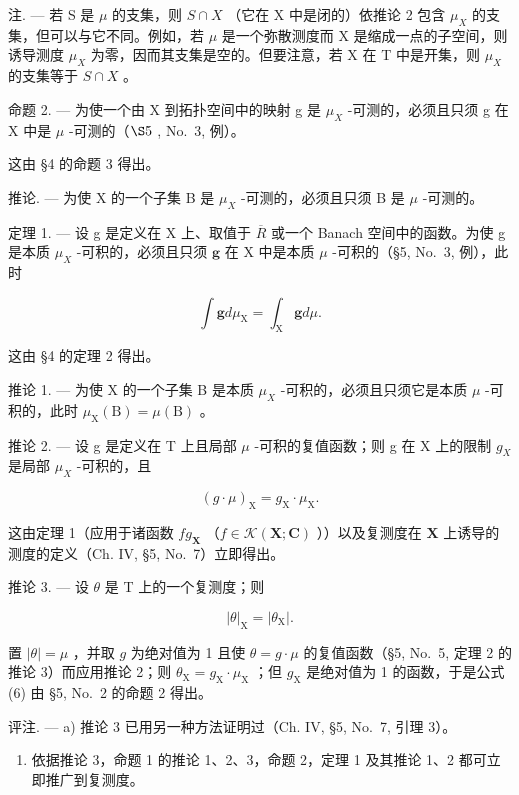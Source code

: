 注. --- 若 S 是 \(\mu\) 的支集，则 \(S \cap X\) （它在 X 中是闭的）依推论 2 包含 \(\mu_{X}\) 的支集，但可以与它不同。例如，若 \(\mu\) 是一个弥散测度而 X 是缩成一点的子空间，则诱导测度 \(\mu_{X}\) 为零，因而其支集是空的。但要注意，若 X 在 T 中是开集，则 \(\mu_{X}\) 的支集等于 \(S \cap X\) 。

命题 2. --- 为使一个由 X 到拓扑空间中的映射 g 是 \(\mu_{X}\) -可测的，必须且只须 g 在 X 中是 \(\mu\) -可测的（\(\S5\) , No.~3, 例）。

这由 §4 的命题 3 得出。

推论. --- 为使 X 的一个子集 B 是 \(\mu_{X}\) -可测的，必须且只须 B 是 \(\mu\) -可测的。

定理 1. --- 设 g 是定义在 X 上、取值于 \(\overline{R}\) 或一个 Banach 空间中的函数。为使 g 是本质 \(\mu_{X}\) -可积的，必须且只须 \(\mathbf{g}\) 在 X 中是本质 \(\mu\) -可积的（§5, No.~3, 例），此时

\[
\int \mathbf {g} d \mu_ {\mathrm{X}} = \int_ {\mathrm{X}} \mathbf {g} d \mu .\tag{4}
\]

这由 §4 的定理 2 得出。

推论 1. --- 为使 X 的一个子集 B 是本质 \(\mu_{X}\) -可积的，必须且只须它是本质 \(\mu\) -可积的，此时 \(\mu_{\mathrm{X}}(\mathrm{B}) = \mu(\mathrm{B})\) 。

推论 2. --- 设 g 是定义在 T 上且局部 \(\mu\) -可积的复值函数；则 g 在 X 上的限制 \(g_{X}\) 是局部 \(\mu_{X}\) -可积的，且

\[
(g \cdot \mu) _ {\mathrm{X}} = g _ {\mathrm{X}} \cdot \mu_ {\mathrm{X}}.\tag{5}
\]

这由定理 1（应用于诸函数 \(fg_{\mathbf{X}}\) （\(f \in \mathcal{K}(\mathbf{X}; \mathbf{C})\) ））以及复测度在 \(\mathbf{X}\) 上诱导的测度的定义（Ch. IV, §5, No.~7）立即得出。

推论 3. --- 设 \(\theta\) 是 T 上的一个复测度；则

\[
| \theta | _ {\mathrm{X}} = | \theta_ {\mathrm{X}} |.\tag{6}
\]

置 \(|\theta| = \mu\) ，并取 \(g\) 为绝对值为 1 且使 \(\theta = g \cdot \mu\) 的复值函数（§5, No.~5, 定理 2 的推论 3）而应用推论 2；则 \(\theta_{\mathrm{X}} = g_{\mathrm{X}} \cdot \mu_{\mathrm{X}}\) ；但 \(g_{\mathrm{X}}\) 是绝对值为 1 的函数，于是公式 (6) 由 §5, No.~2 的命题 2 得出。

评注. --- a) 推论 3 已用另一种方法证明过（Ch. IV, §5, No.~7, 引理 3）。

\begin{enumerate}
\def\labelenumi{\alph{enumi})}
\setcounter{enumi}{1}
\tightlist
\item
  依据推论 3，命题 1 的推论 1、2、3，命题 2，定理 1 及其推论 1、2 都可立即推广到复测度。
\end{enumerate}

